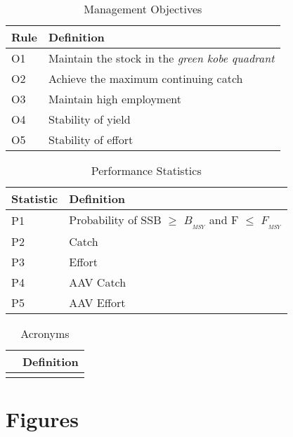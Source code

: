 \documentclass[%
nonumbib,      %
%
]{nrc1}                          %
\begin{document}
\begin{table}[h!]
  \label{tab:objectives}
  \caption{Management Objectives}  
  \begin{center}
    \begin{tabular}{ l p{10cm} }
    \hline
    Rule & Definition \\
    \hline 
     O1   & Maintain the stock in the \emph{green kobe quadrant}\\
     O2   & Achieve the maximum continuing catch \\
     O3   & Maintain high employment \\
     O4   & Stability of yield \\
     O5   & Stability of effort \\
     \hline
    \end{tabular}
  \end{center}
\end{table}

\begin{table}[h!]
  \label{tab:measures}
  \caption{Performance Statistics}  
  \begin{center}
    \begin{tabular}{ l p{10cm} }
    \hline 
    Statistic & Definition \\ 
    \hline 
    P1   & Probability of SSB $\geq$ $B_{_{MSY}}$ and F $\le$  $F_{_{MSY}}$ \\ 
    P2   & Catch\\ 
    P3   & Effort\\ 
    P4   & AAV Catch  \\ 
    P5   & AAV Effort  \\ 
    \hline 
    \end{tabular}
  \end{center}
\end{table}


\begin{table}[h!]
  \label{tab:acronyms}
  \caption{Acronyms}  
  \begin{center}
    \begin{tabular}{ l p{10cm} }
    \hline 
     & Definition \\ 
    \hline 
       &  \\ 
    \hline 
    \end{tabular}
  \end{center}
\end{table}

\newpage\clearpage
\section*{Figures}
\end{document}
